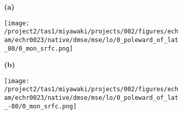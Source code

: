 \documentclass[preview]{standalone}
\begin{document}
\begin{figure}
  \begin{subfigure}[t]{0.05\textwidth}
    \textbf{\normalsize{(a)}}
  \end{subfigure}
  \begin{subfigure}[t]{0.95\textwidth}
    \texttt{[image: /project2/tas1/miyawaki/projects/002/figures/echam/echr0023/native/dmse/mse/lo/0\_poleward\_of\_lat\_80/0\_mon\_srfc.png]}
  \end{subfigure}
  
  \begin{subfigure}[t]{0.05\textwidth}
    \textbf{\normalsize{(b)}}
  \end{subfigure}
  \begin{subfigure}[t]{0.95\textwidth}
    \texttt{[image: /project2/tas1/miyawaki/projects/002/figures/echam/echr0023/native/dmse/mse/lo/0\_poleward\_of\_lat\_-80/0\_mon\_srfc.png]}
  \end{subfigure}
\end{figure}
\end{document}

